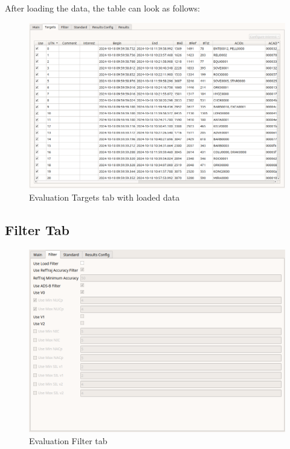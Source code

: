 After loading the data, the table can look as follows:

\begin{figure}[H]
  \hspace*{-2cm}
    \includegraphics[width=18cm,frame]{figures/eval_targets_loaded.png}
  \caption{Evaluation Targets tab with loaded data}
\end{figure}

\subsection{Filter Tab}

\begin{figure}[H]
  \hspace*{-2cm}
    \includegraphics[width=18cm,frame]{figures/eval_filter.png}
  \caption{Evaluation Filter tab}
\end{figure}

